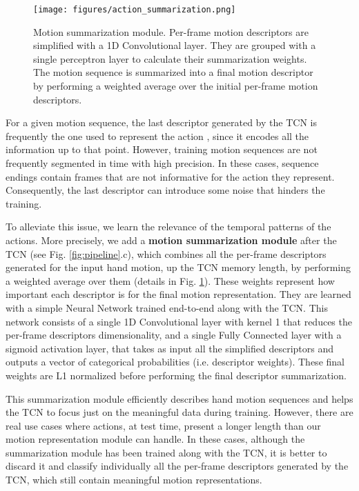 \documentclass[letterpaper, 10 pt, conference]{ieeeconf}
\begin{document}
\begin{figure}
    \centering
    \texttt{[image: figures/action\_summarization.png]}
    \caption{Motion summarization module. Per-frame motion descriptors are simplified with a 1D Convolutional layer. They are grouped with a single perceptron layer to calculate their summarization weights. The motion sequence is summarized into a final motion descriptor by performing a weighted average over the initial per-frame motion descriptors.}
    \label{fig:summarization}
\end{figure}

For a given motion sequence, the last descriptor generated by the TCN is frequently the one used to represent the action \cite{sabater2021oneshot}, since it encodes all the information up to that point. 
However, training motion sequences are not frequently segmented in time with high precision. In these cases, sequence endings contain frames that are not informative for the action they represent. Consequently, the last descriptor can introduce some noise that hinders the training.

To alleviate this issue, we learn the relevance of the temporal patterns of the actions. More precisely, we add a \textbf{motion summarization module} after the TCN (see Fig. \ref{fig:pipeline}.c), which combines all the per-frame descriptors generated for 
the input hand motion, 
up the TCN memory length, by performing a weighted average over them (details in Fig. \ref{fig:summarization}). 
These weights represent how important each descriptor is for the final motion representation. They are learned with a simple Neural Network trained end-to-end along with the TCN. 
This network consists of a single 1D Convolutional layer with kernel 1 that reduces the per-frame descriptors dimensionality, and a single Fully Connected layer with a sigmoid activation layer, that takes as input all the simplified descriptors and outputs a vector of categorical probabilities (i.e. descriptor weights). These final weights are L1 normalized before performing the final descriptor summarization. 

This summarization module efficiently describes hand motion sequences and helps the TCN to focus just on the meaningful data during training. However, there are real use cases where actions, at test time, present a longer length than our motion representation module can handle. In these cases, although the summarization module has been trained along with the TCN, it is better to discard it and classify individually all the per-frame descriptors generated by the TCN, which still contain meaningful motion representations. 
\end{document}
